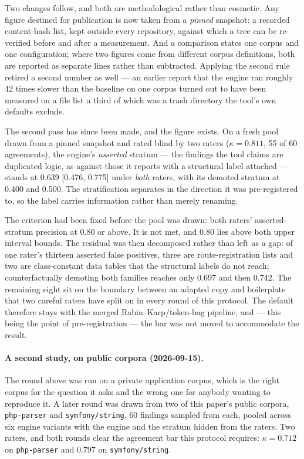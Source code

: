 \documentclass[10pt,a4paper]{article}
\begin{document}
Two changes follow, and both are methodological rather than cosmetic. Any figure destined for
publication is now taken from a \emph{pinned} snapshot: a recorded content-hash list, kept outside
every repository, against which a tree can be re-verified before and after a measurement. And a
comparison states one corpus and one configuration; where two figures come from different corpus
definitions, both are reported as separate lines rather than subtracted. Applying the second rule
retired a second number as well --- an earlier report that the engine ran roughly 42 times slower
than the baseline on one corpus turned out to have been measured on a file list a third of which
was a trash directory the tool's own defaults exclude.

The second pass has since been made, and the figure exists. On a fresh pool drawn from a pinned
snapshot and rated blind by two raters ($\kappa = 0.811$, 55 of 60 agreements), the engine's
\emph{asserted} stratum --- the findings the tool claims are duplicated logic, as against those it
reports with a structural label attached --- stands at 0.639 [0.476, 0.775] under \emph{both}
raters, with its demoted stratum at 0.400 and 0.500. The stratification separates in the direction
it was pre-registered to, so the label carries information rather than merely renaming.

The criterion had been fixed before the pool was drawn: both raters' asserted-stratum precision at
0.80 or above. It is not met, and 0.80 lies above both upper interval bounds. The residual was then
decomposed rather than left as a gap: of one rater's thirteen asserted false positives, three are
route-registration lists and two are class-constant data tables that the structural labels do not
reach; counterfactually demoting both families reaches only 0.697 and then 0.742. The remaining
eight sit on the boundary between an adapted copy and boilerplate that two careful raters have
split on in every round of this protocol. The default therefore stays with the merged
Rabin--Karp/token-bag pipeline, and --- this being the point of pre-registration --- the bar was not
moved to accommodate the result.

\paragraph{A second study, on public corpora (2026-09-15).} The round above was
run on a private application corpus, which is the right corpus for the question
it asks and the wrong one for anybody wanting to reproduce it. A later round was
drawn from two of this paper's public corpora, \texttt{php-parser} and
\texttt{symfony/string}, 60 findings sampled from each, pooled across six engine
variants with the engine and the stratum hidden from the raters. Two raters, and
both rounds clear the agreement bar this protocol requires: $\kappa = 0.712$ on
\texttt{php-parser} and $0.797$ on \texttt{symfony/string}.
\end{document}
